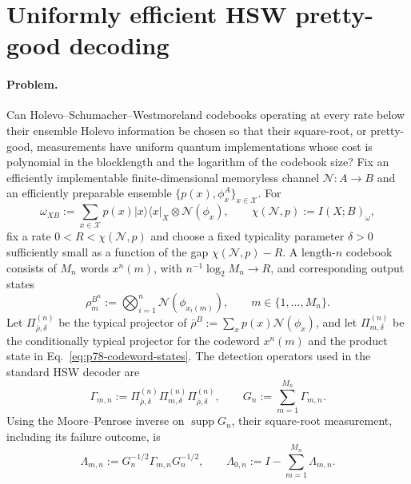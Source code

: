 \section{Uniformly efficient HSW pretty-good decoding}
\label{sec:op_2c9c3abb0983004c}

\paragraph{Problem.}
Can Holevo--Schumacher--Westmoreland codebooks operating at every rate below
their ensemble Holevo information be chosen so that their square-root, or
pretty-good, measurements have uniform quantum
implementations whose cost is polynomial in the blocklength and the logarithm
of the codebook size?  Fix an efficiently implementable finite-dimensional
memoryless channel $\mathcal N:A\to B$ and an efficiently preparable ensemble
$\{p(x),\phi_x^A\}_{x\in\mathcal X}$.  For
\begin{equation}
  \omega_{XB}:=\sum_{x\in\mathcal X}p(x)|x\rangle\!\langle x|_X
    \otimes\mathcal N(\phi_x),
  \qquad
  \chi(\mathcal N,p):=I(X;B)_\omega,
  \label{eq:p78-holevo-information}
\end{equation}
fix a rate $0<R<\chi(\mathcal N,p)$ and choose a fixed typicality parameter
$\delta>0$ sufficiently small as a function of the gap
$\chi(\mathcal N,p)-R$.  A length-$n$ codebook consists of
$M_n$ words $x^n(m)$, with $n^{-1}\log_2M_n\to R$, and corresponding output
states
\begin{equation}
  \rho_m^{B^n}:=\bigotimes_{i=1}^{n}\mathcal N(\phi_{x_i(m)}),
  \qquad m\in\{1,\ldots,M_n\}.
  \label{eq:p78-codeword-states}
\end{equation}
Let $\Pi_{\bar\rho,\delta}^{(n)}$ be the typical projector of
$\bar\rho^B:=\sum_x p(x)\mathcal N(\phi_x)$, and let
$\Pi_{m,\delta}^{(n)}$ be the conditionally typical projector for the
codeword $x^n(m)$ and the product state in
Eq.~\eqref{eq:p78-codeword-states}.  The detection operators used in the
standard HSW decoder are
\begin{equation}
  \Gamma_{m,n}
  :=\Pi_{\bar\rho,\delta}^{(n)}
      \Pi_{m,\delta}^{(n)}
      \Pi_{\bar\rho,\delta}^{(n)},
  \qquad
  G_n:=\sum_{m=1}^{M_n}\Gamma_{m,n}.
  \label{eq:p78-hsw-detection-operators}
\end{equation}
Using the Moore--Penrose inverse on $\operatorname{supp}G_n$, their
square-root measurement, including its failure outcome, is
\begin{equation}
  \Lambda_{m,n}:=G_n^{-1/2}\Gamma_{m,n}G_n^{-1/2},
  \qquad
  \Lambda_{0,n}:=I-\sum_{m=1}^{M_n}\Lambda_{m,n}.
  \label{eq:p78-hsw-pgm}
\end{equation}


